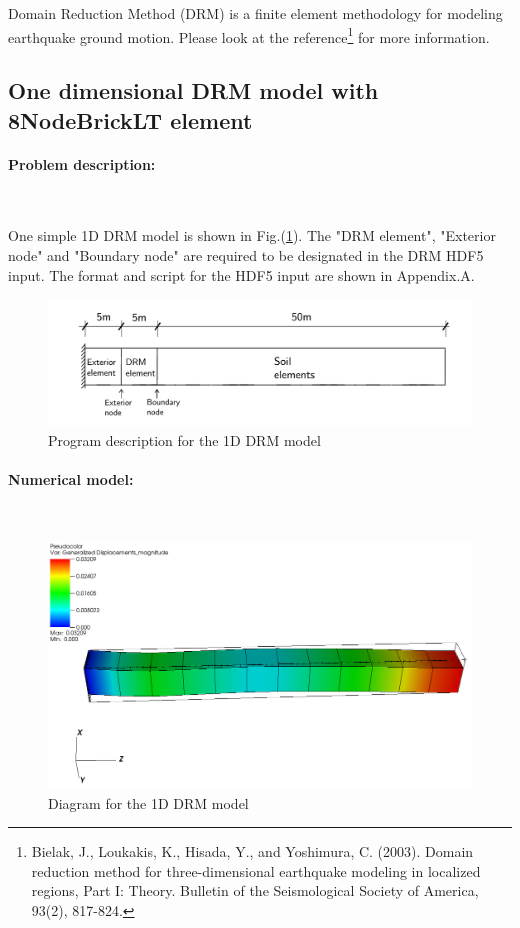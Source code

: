 \documentclass[fleqn,11pt]{article}
\begin{document}
Domain Reduction Method (DRM) is a finite element methodology for modeling earthquake ground motion. Please look at the reference\footnote{Bielak, J., Loukakis, K., Hisada, Y., and Yoshimura, C. (2003). Domain reduction method for three-dimensional earthquake modeling in localized regions, Part I: Theory. Bulletin of the Seismological Society of America, 93(2), 817-824.} for more information. 

\subsection{One dimensional DRM model with 8NodeBrickLT element}

\paragraph{Problem description:} ~


One simple 1D DRM model is shown in Fig.(\ref{fig Program description for the 1D DRM model}). The "DRM element", "Exterior node" and "Boundary node" are required to be designated in the DRM HDF5 input. The format and script for the HDF5 input are shown in Appendix.A. 

\begin{figure}[H]
  \centering
  \includegraphics[width=18cm]{../Figure-files/DRM_1D_descrp.pdf}
  \caption{Program description for the 1D DRM model}
  \label{fig Program description for the 1D DRM model}
\end{figure}




\paragraph{Numerical model:} ~


\begin{figure}[H]
  \centering
  \includegraphics[width=15cm]{../Figure-files/DRM_1D_result41.png}
  \caption{Diagram for the 1D DRM model}
  \label{fig Diagram for the 1D DRM model}
\end{figure}
\end{document}
